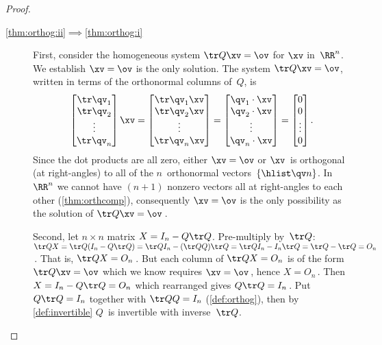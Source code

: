 \begin{proof}
\begin{description}
\item[\ref{thm:orthog:ii}$\implies$\ref{thm:orthog:i}] 
First, consider the homogeneous system \(\tr Q\xv=\ov\) for \(\xv\) in~\(\RR^n\).
We establish \(\xv=\ov\) is the only solution.
The system \(\tr Q\xv=\ov\), written in terms of the orthonormal columns of~\(Q\), is 
\begin{equation*}
\begin{bmatrix} \tr\qv_1\\\tr\qv_2\\\vdots\\\tr\qv_n \end{bmatrix}\xv
=\begin{bmatrix} \tr\qv_1\xv\\\tr\qv_2\xv\\\vdots\\\tr\qv_n\xv \end{bmatrix}
=\begin{bmatrix} \qv_1\cdot\xv\\\qv_2\cdot\xv\\\vdots\\\qv_n\cdot\xv \end{bmatrix}
=\begin{bmatrix} 0\\0\\\vdots\\0 \end{bmatrix}.
\end{equation*}
Since the dot products are all zero, either \(\xv=\ov\) or \(\xv\)~is 
orthogonal (at right-angles) to all of the \(n\)~orthonormal vectors~\(\{\hlist\qv n\}\).
In~\(\RR^n\) we cannot have \((n+1)\) nonzero vectors all at right-angles to each other (\cref{thm:orthcomp}), consequently \(\xv=\ov\) is the only possibility as the solution of \(\tr Q\xv=\ov\)\,.

Second, let \(n\times n\) matrix \(X=I_n-Q\tr Q\).
Pre-multiply by~\(\tr Q\): \(\tr QX
=\tr Q(I_n-Q\tr Q)
=\tr QI_n-(\tr QQ)\tr Q
=\tr QI_n-I_n\tr Q
=\tr Q-\tr Q
=O_n\)\,.
That is, \(\tr QX=O_n\)\,. 
But each column of \(\tr QX=O_n\) is of the form \(\tr Q\xv=\ov\) which we know requires \(\xv=\ov\)\,, hence \(X=O_n\)\,.
Then \(X=I_n-Q\tr Q=O_n\) which rearranged gives \(Q\tr Q=I_n\)\,. 
Put \(Q\tr Q=I_n\) together with \(\tr QQ=I_n\) (\cref{def:orthog}),  then by \cref{def:invertible}  \(Q\)~is invertible with inverse~\(\tr Q\).


\end{description}
\end{proof}
